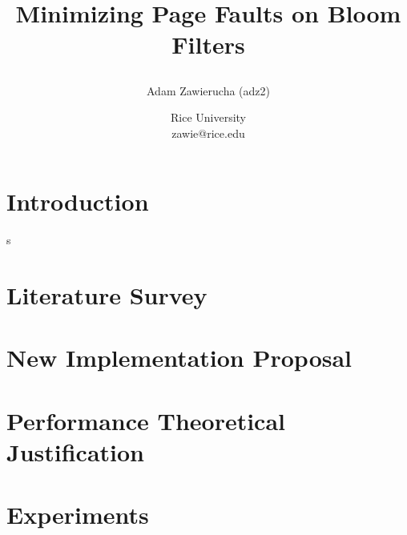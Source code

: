 \documentclass[a4paper]{article}
\title{Minimizing Page Faults on Bloom Filters
\author{Adam Zawierucha (adz2)}

\date{
	Rice University \\ zawie@rice.edu}%
}
\theoremstyle{plain}
\theoremstyle{definition}
\begin{document}
	\maketitle
	
	\begin{abstract}
		
	\end{abstract}
	

	\section{Introduction}
	
s
	\section{Literature Survey}
	

	\section{New Implementation Proposal}
	

	\section{Performance Theoretical Justification}
	

	\section{Experiments}
	



	
	
\end{document}
